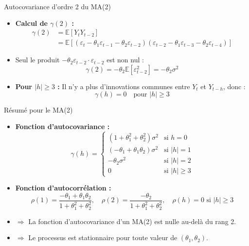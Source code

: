 \documentclass[11pt,aspectratio=169]{beamer}
\newcommand{\E}{\mathbb{E}}
\begin{document}
\begin{frame}{Autocovariance d'ordre 2 du MA(2)}

\begin{itemize}

\item \textbf{Calcul de $\gamma(2)$ :}
\begin{align*}
\gamma(2) &= \E[Y_t Y_{t-2}] \\
&= \E[(\varepsilon_t - \theta_1 \varepsilon_{t-1} - \theta_2 \varepsilon_{t-2})(\varepsilon_{t-2} - \theta_1 \varepsilon_{t-3} - \theta_2 \varepsilon_{t-4})]
\end{align*}

\item Seul le produit $-\theta_2 \varepsilon_{t-2} \cdot \varepsilon_{t-2}$ est non nul :
\[
\gamma(2) = -\theta_2 \E[\varepsilon_{t-2}^2] = -\theta_2 \sigma^2
\]

\item \textbf{Pour $|h| \geq 3$ :} Il n'y a plus d'innovations communes entre $Y_t$ et $Y_{t-h}$, donc :
\[
\gamma(h) = 0 \quad \text{pour } |h| \geq 3
\]

\end{itemize}
\end{frame}

\begin{frame}{Résumé pour le MA(2)}

\begin{itemize}

\item \textbf{Fonction d'autocovariance :} \[
\gamma(h) = \begin{cases}
(1 + \theta_1^2 + \theta_2^2) \sigma^2 & \text{si } h = 0 \\
(-\theta_1 + \theta_1 \theta_2) \sigma^2 & \text{si } |h| = 1 \\
-\theta_2 \sigma^2 & \text{si } |h| = 2 \\
0 & \text{si } |h| \geq 3
\end{cases}
\]

\item \textbf{Fonction d'autocorrélation :} \[
\rho(1) = \frac{-\theta_1 + \theta_1 \theta_2}{1 + \theta_1^2 + \theta_2^2}, \quad \rho(2) = \frac{-\theta_2}{1 + \theta_1^2 + \theta_2^2}, \quad \rho(h) = 0 \text{ si } |h| \geq 3
\]

\item $\Rightarrow$ La fonction d'autocovariance d'un MA(2) est nulle au-delà du rang 2.\newline

\item $\Rightarrow$ Le processus est stationnaire pour toute valeur de $(\theta_1, \theta_2)$.

\end{itemize}
\end{frame}
\end{document}
